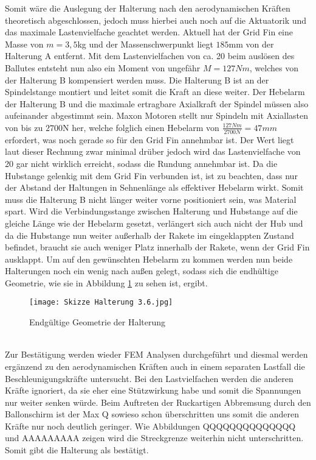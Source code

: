 Somit wäre die Auslegung der Halterung nach den aerodynamischen Kräften theoretisch abgeschlossen, jedoch muss hierbei auch noch auf die Aktuatorik und das maximale Lastenvielfache geachtet werden. Aktuell hat der Grid Fin eine Masse von $m = 3,5$kg und der Massenschwerpunkt liegt $185$mm von der Halterung A entfernt. Mit dem Lastenvielfachen von ca. 20 beim auslösen des Ballutes entsteht nun also ein Moment von ungefähr $M=127Nm$, welches von der Halterung B kompensiert werden muss. Die Halterung B ist an der Spindelstange montiert und leitet somit die Kraft an diese weiter. Der Hebelarm der Halterung B und die maximale ertragbare Axialkraft der Spindel müssen also aufeinander abgestimmt sein. Maxon Motoren stellt nur Spindeln mit Axiallasten von bis zu $2700$N her, welche folglich einen Hebelarm von $\frac{127Nm}{2700N}=47mm$ erfordert, was noch gerade so für den Grid Fin annehmbar ist. Der Wert liegt laut dieser Rechnung zwar minimal drüber jedoch wird das Lastenvielfache von 20 gar nicht wirklich erreicht, sodass die Rundung annehmbar ist. Da die Hubstange gelenkig mit dem Grid Fin verbunden ist, ist zu beachten, dass nur der Abstand der Haltungen in Sehnenlänge als effektiver Hebelarm wirkt. Somit muss die Halterung B nicht länger weiter vorne positioniert sein, was Material spart. Wird die Verbindungsstange zwischen Halterung und Hubstange auf die gleiche Länge wie der Hebelarm gesetzt, verlängert sich auch nicht der Hub und da die Hubstange nun weiter außerhalb der Rakete im eingeklappten Zustand befindet, braucht sie auch weniger Platz innerhalb der Rakete, wenn der Grid Fin ausklappt. Um auf den gewünschten Hebelarm zu kommen werden nun beide Halterungen noch ein wenig nach außen gelegt, sodass sich die endhültige Geometrie, wie sie in Abbildung \ref{abb_Halterung-fertig} zu sehen ist, ergibt.
\begin{figure}[h] 
	\centering
	\texttt{[image: Skizze Halterung 3.6.jpg]}
	\caption{Endgültige Geometrie der Halterung}
	\label{abb_Halterung-fertig}
\end{figure}\\
Zur Bestätigung werden wieder FEM Analysen durchgeführt und diesmal werden ergänzend zu den aerodynamischen Kräften auch in einem separaten Lastfall die Beschleunigungskräfte untersucht. Bei den Lastvielfachen werden die anderen Kräfte ignoriert, da sie eher eine Stützwirkung habe und somit die Spannungen nur weiter senken würde. Beim Auftreten der Ruckartigen Abbremsung durch den Ballonschirm ist der Max Q sowieso schon überschritten uns somit die anderen Kräfte nur noch deutlich geringer. Wie Abbildungen QQQQQQQQQQQQQQ und AAAAAAAAA zeigen wird die Streckgrenze weiterhin nicht unterschritten. Somit gibt die Halterung als bestätigt.

